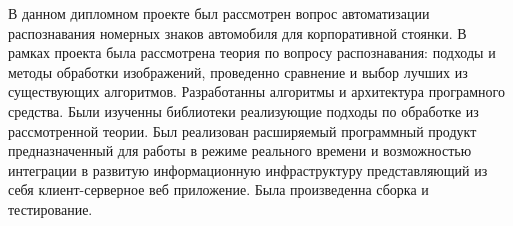 
В данном дипломном проекте был рассмотрен вопрос автоматизации распознавания номерных знаков автомобиля для корпоративной стоянки. В рамках проекта была рассмотрена теория по вопросу распознавания: подходы и методы обработки изображений, проведенно сравнение и выбор лучших из существующих алгоритмов. Разработанны алгоритмы и архитектура програмного средства. Были изученны библиотеки реализующие подходы по обработке из рассмотренной теории. Был реализован расширяемый программный продукт предназначенный для работы в режиме реального времени и возможностью интеграции в развитую информационную инфраструктуру представляющий из себя клиент-серверное веб приложение. Была произведенна сборка и тестирование.
